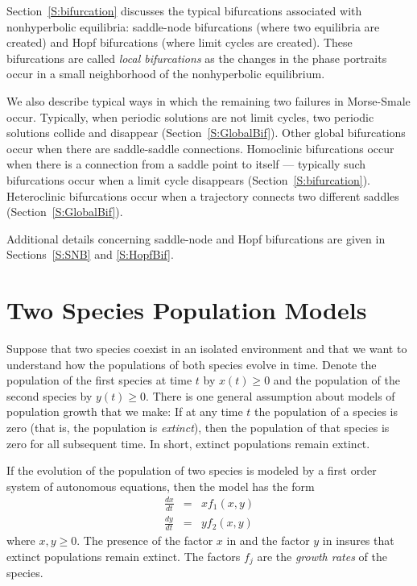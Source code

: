 Section~\ref{S:bifurcation} discusses the typical bifurcations associated 
with nonhyperbolic equilibria: saddle-node bifurcations (where two equilibria 
are created) and Hopf bifurcations (where limit cycles are created).  These 
bifurcations are called {\em local bifurcations\/} as the changes in the phase 
portraits occur in a small neighborhood of the nonhyperbolic equilibrium.  

We also describe typical ways in which the remaining two failures in 
Morse-Smale occur.  Typically, when periodic solutions are not limit cycles, 
two periodic solutions collide and disappear (Section~\ref{S:GlobalBif}).  
Other global bifurcations occur when there are saddle-saddle connections.  
Homoclinic bifurcations occur when there is a connection from a saddle point 
to itself --- typically such bifurcations occur when a limit cycle disappears
(Section~\ref{S:bifurcation}).   Heteroclinic bifurcations occur when a 
trajectory connects two different saddles (Section~\ref{S:GlobalBif}).

Additional details concerning saddle-node and Hopf bifurcations are given in 
Sections~\ref{S:SNB} and \ref{S:HopfBif}.




\section{Two Species Population Models}
\label{S:TSPM} 

Suppose that two species coexist in an isolated environment and
that we want to understand how the populations of both species
evolve in time.  Denote the population of the first species at time 
$t$ by $x(t)\ge 0$ and the population of the second species
by $y(t)\ge 0$.  There is one general assumption about models of
population growth that we make: If at any time $t$ the
population of a species is zero (that is, the population is {\em
extinct\/}), then the population of that species is zero for all
subsequent time.  In short, extinct populations remain extinct.

If the evolution of the population of two species is modeled by a
first order system of autonomous equations, then the model has the form
\begin{eqnarray}
\frac{dx}{dt} & = & xf_1(x,y) \label{e:pop1a} \\
\frac{dy}{dt} & = & yf_2(x,y) \label{e:pop1b}
\end{eqnarray}  
where $x,y \ge 0$.
The presence of the factor $x$ in  and the factor
$y$ in  insures that extinct populations remain
extinct. The factors $f_j$ are the {\em growth rates\/} of the 
species.


